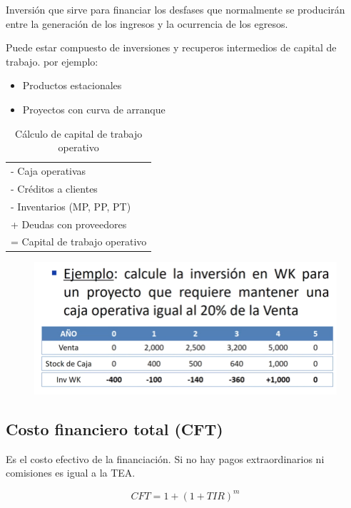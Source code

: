 \documentclass[twocolumn,10pt]{article}
\begin{document}
Inversión que sirve para financiar los desfases que normalmente se producirán entre la generación de los ingresos y la ocurrencia de los egresos.

Puede estar compuesto de inversiones y recuperos intermedios de capital de trabajo. por ejemplo:

\begin{itemize}
	\item Productos estacionales
	\item Proyectos con curva de arranque
\end{itemize}

\begin{table}[h]
	\centering
	\begin{tabular}{|l|} \hline
		- Caja operativas \\
		- Créditos a clientes \\
		- Inventarios (MP, PP, PT) \\ \hline
		+ Deudas con proveedores    \\ \hline
		= Capital de trabajo operativo \\ \hline
	\end{tabular}
\caption{Cálculo de capital de trabajo operativo}
\end{table}




\begin{figure}[htb]
	\centering
	\includegraphics[width=1\linewidth]{fig/working_capital_example.png}
	\caption{}
	\label{fig:working_capital_example}
\end{figure}



\subsection{Costo financiero total (CFT)}

Es el costo efectivo de la financiación. Si no hay pagos extraordinarios ni comisiones es igual a la TEA.

\[
	CFT =  1 + (1+TIR)^{m}
\]
\end{document}
